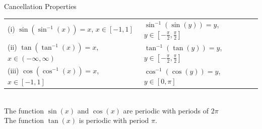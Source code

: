\documentclass[14pt]{article}
\begin{document}
    Cancellation Properties\\
    \begin{tabular}{p{6cm}|p{5cm}}
        (i) $\sin(\sin^{-1}(x))=x$, $x\in[-1,1]$ & $\sin^{-1}(\sin(y))=y$, $y\in\left[-\frac{\pi}{2}, \frac{\pi}{2}\right]$\\
        (ii) $\tan(\tan^{-1}(x))=x$, $x\in(-\infty,\infty)$ & $\tan^{-1}(\tan(y))=y$, $y\in\left[-\frac{\pi}{2}, \frac{\pi}{2}\right]$\\
        (iii) $\cos(\cos^{-1}(x))=x$, $x\in[-1,1]$ & $\cos^{-1}(\cos(y))=y$, $y\in\left[0, \pi\right]$\\
    \end{tabular}\\
    The function $\sin(x)$ and $\cos(x)$ are periodic with periods of $2\pi$\\
    The function $\tan(x)$ is periodic with period $\pi$. 
\end{document}
